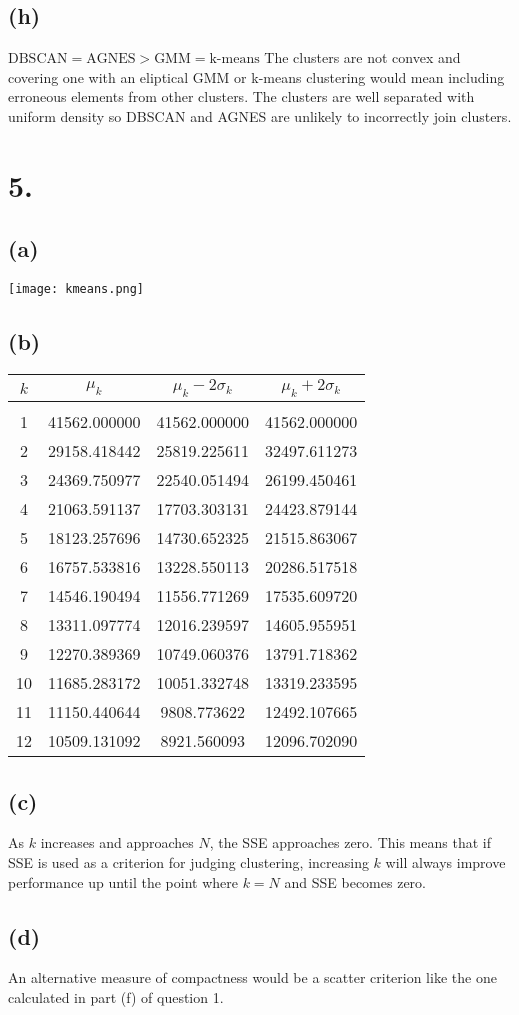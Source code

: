 \documentclass[12pt]{article}
\begin{document}
	\subsection*{(h)}
	$\textrm{DBSCAN} = \textrm{AGNES} > \textrm{GMM} = \textrm{k-means}$
	The clusters are not convex and covering one with an eliptical GMM or k-means clustering would
	mean including erroneous elements from other clusters. The clusters are well separated with
	uniform density so DBSCAN and AGNES are unlikely to incorrectly join clusters.

	\section*{5.}	

	\subsection*{(a)}
	\texttt{[image: kmeans.png]}

	\subsection*{(b)}
	\begin{tabular}{c | c | c | c}
		$k$ & $\mu_k$ & $\mu_k-2\sigma_k$ & $\mu_k+2\sigma_k$ \\
		\hline & & & \\
		1 & 41562.000000 & 41562.000000 & 41562.000000 \\
		2 & 29158.418442 & 25819.225611 & 32497.611273 \\
		3 & 24369.750977 & 22540.051494 & 26199.450461 \\
		4 & 21063.591137 & 17703.303131 & 24423.879144 \\
		5 & 18123.257696 & 14730.652325 & 21515.863067 \\
		6 & 16757.533816 & 13228.550113 & 20286.517518 \\
		7 & 14546.190494 & 11556.771269 & 17535.609720 \\
		8 & 13311.097774 & 12016.239597 & 14605.955951 \\
		9 & 12270.389369 & 10749.060376 & 13791.718362 \\
		10 & 11685.283172 & 10051.332748 & 13319.233595 \\
		11 & 11150.440644 & 9808.773622 & 12492.107665 \\
		12 & 10509.131092 & 8921.560093 & 12096.702090 
	\end{tabular}

	\subsection*{(c)}
	As $k$ increases and approaches $N$, the SSE approaches zero. This means
	that if SSE is used as a criterion for judging clustering, increasing $k$
	will always improve performance up until the point where $k=N$ and SSE becomes
	zero.

	\subsection*{(d)}
	An alternative measure of compactness would be a scatter criterion like the one
	calculated in part (f) of question 1.
 
\end{document}
